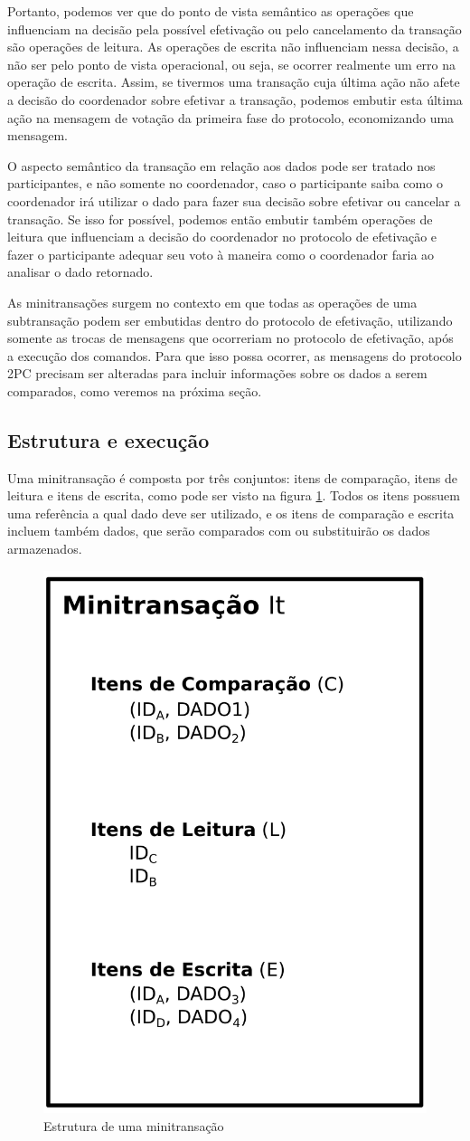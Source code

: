 \documentclass[11pt,twoside,a4paper]{book}
\begin{document}
Portanto, podemos ver que do ponto de vista semântico as operações que influenciam na decisão pela possível efetivação ou pelo cancelamento da transação são operações de leitura. As operações de escrita não influenciam nessa decisão, a não ser pelo ponto de vista operacional, ou seja, se ocorrer realmente um erro na operação de escrita. Assim, se tivermos uma transação cuja última ação não afete a decisão do coordenador sobre efetivar a transação, podemos embutir esta última ação na mensagem de votação da primeira fase do protocolo, economizando uma mensagem.

O aspecto semântico da transação em relação aos dados pode ser tratado nos participantes, e não somente no coordenador, caso o participante saiba como o coordenador irá utilizar o dado para fazer sua decisão sobre efetivar ou cancelar a transação. Se isso for possível, podemos então embutir também operações de leitura que influenciam a decisão do coordenador no protocolo de efetivação e fazer o participante adequar seu voto à maneira como o coordenador faria ao analisar o dado retornado.

As minitransações surgem no contexto em que todas as operações de uma subtransação podem ser embutidas dentro do protocolo de efetivação, utilizando somente as trocas de mensagens que ocorreriam no protocolo de efetivação, após a execução dos comandos. Para que isso possa ocorrer, as mensagens do protocolo 2PC precisam ser alteradas para incluir informações sobre os dados a serem comparados, como veremos na próxima seção.

\subsection{Estrutura e execução}
\label{subsec:estrutura-minitransacoes}
Uma minitransação é composta por três conjuntos: itens de comparação, itens de leitura e itens de escrita, como pode ser visto na figura \ref{fig:estrutura_minitransacao}. Todos os itens possuem uma referência a qual dado deve ser utilizado, e os itens de comparação e escrita incluem também dados, que serão comparados com ou substituirão os dados armazenados. 

\begin{figure}
  \centering
  \includegraphics[width=.40\textwidth]{estrutura_minitransacao} 
  \caption{Estrutura de uma minitransação}
  \label{fig:estrutura_minitransacao} 
\end{figure}
\end{document}
